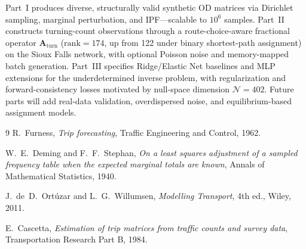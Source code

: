 \documentclass[11pt,a4paper]{report}
\newcommand{\Aturn}{\mathbf{A}_{\mathrm{turn}}}
\begin{document}
Part~I produces diverse, structurally valid synthetic OD matrices via Dirichlet sampling, marginal perturbation, and IPF---scalable to $10^6$ samples. Part~II constructs turning-count observations through a route-choice-aware fractional operator $\Aturn$ ($\mathrm{rank}=174$, up from 122 under binary shortest-path assignment) on the Sioux Falls network, with optional Poisson noise and memory-mapped batch generation. Part~III specifies Ridge/Elastic Net baselines and MLP extensions for the underdetermined inverse problem, with regularization and forward-consistency losses motivated by null-space dimension $\mathcal{N}=402$. Future parts will add real-data validation, overdispersed noise, and equilibrium-based assignment models.

\begin{thebibliography}{9}
R.~Furness, \emph{Trip forecasting}, Traffic Engineering and Control, 1962.

W.~E.~Deming and F.~F.~Stephan,
\emph{On a least squares adjustment of a sampled frequency table when the expected marginal totals are known},
Annals of Mathematical Statistics, 1940.

J.~de~D.~Ort\'{u}zar and L.~G.~Willumsen,
\emph{Modelling Transport}, 4th ed., Wiley, 2011.

E.~Cascetta,
\emph{Estimation of trip matrices from traffic counts and survey data},
Transportation Research Part B, 1984.
\end{thebibliography}
\end{document}
